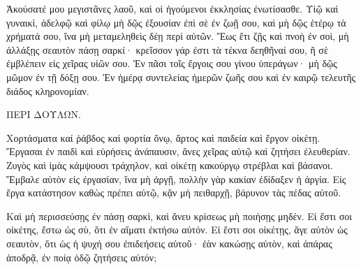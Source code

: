 {Ἀκούσατέ μου μεγιστᾶνες λαοῦ, καὶ οἱ ἡγούμενοι ἐκκλησίας ἐνωτίσασθε.
Υἱῷ καὶ γυναικὶ, ἀδελφῷ καὶ φίλῳ μὴ δῷς ἐξουσίαν ἐπὶ σὲ ἐν ζωῇ σου, καὶ μὴ δῷς ἑτέρῳ τὰ χρήματά σου, ἵνα μὴ μεταμεληθεὶς δέῃ περὶ αὐτῶν.
Ἕως ἔτι ζῇς καὶ πνοὴ ἐν σοὶ, μὴ ἀλλάξῃς σεαυτὸν πάσῃ σαρκί·
κρεῖσσον γάρ ἐστι τὰ τέκνα δεηθῆναί σου, ἢ σὲ ἐμβλέπειν εἰς χεῖρας υἱῶν σου.
Ἐν πᾶσι τοῖς ἔργοις σου γίνου ὑπεράγων· μὴ δῷς μῶμον ἐν τῇ δόξῃ σου.
Ἐν ἡμέρᾳ συντελείας ἡμερῶν ζωῆς σου καὶ ἐν καιρῷ τελευτῆς διάδος κληρονομίαν.
\par }{\PP ΠΕΡΙ ΔΟΥΛΩΝ.
\par }{\PP {}Χορτάσματα καί ῥάβδος καὶ φορτία ὄνῳ, ἄρτος καὶ παιδεία καὶ ἔργον οἱκέτῃ.
Ἔργασαι ἐν παιδὶ καὶ εὑρήσεις ἀνάπαυσιν, ἄνες χεῖρας αὐτῷ καὶ ζητήσει ἐλευθερίαν.
Ζυγὸς καὶ ἱμὰς κάμψουσι τράχηλον, καὶ οἰκέτῃ κακούργῳ στρέβλαι καὶ βάσανοι.
Ἔμβαλε αὐτὸν εἰς ἐργασίαν, ἵνα μὴ ἀργῇ, πολλὴν γὰρ κακίαν ἐδίδαξεν ἡ ἀργία.
Εἰς ἔργα κατάστησον καθὼς πρέπει αὐτῷ, κᾂν μὴ πειθαρχῇ, βάρυνον τὰς πέδας αὐτοῦ.
\par }{\PP {}Καὶ μὴ περισσεύσῃς ἐν πάσῃ σαρκὶ, καὶ ἄνευ κρίσεως μὴ ποιήσῃς μηδέν.
Εἰ ἔστι σοι οἰκέτης, ἔστω ὡς σὺ, ὅτι ἐν αἵματι ἐκτήσω αὐτόν.
Εἰ ἔστι σοι οἰκέτῃς, ἄγε αὐτὸν ὡς σεαυτὸν, ὅτι ὡς ἡ ψυχή σου ἐπιδεήσεις αὐτοῦ· ἐὰν κακώσῃς αὐτὸν, καὶ ἀπάρας ἀποδρᾷ, ἐν ποίᾳ ὁδῷ ζητήσεις αὐτόν;

}
